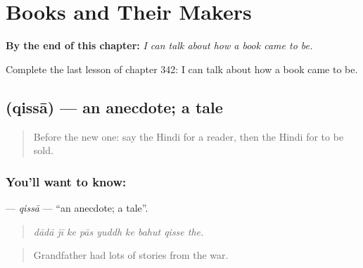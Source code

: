 
\chapter{Books and Their Makers}
\label{ch:hi-books-and-their-makers}

\begin{chapteropening}
\textbf{By the end of this chapter:} \emph{I can talk about how a book came to be.}

Complete the last lesson of chapter 342: I can talk about how a book came to be.
\end{chapteropening}

\section[\texorpdfstring{\hi{क़िस्सा} (qissā)}{क़िस्सा (qissā)}]{ (qissā) — an anecdote; a tale}

\label{lesson:HI-C342-qissa}



\begin{quote}
Before the new one: say the Hindi for a reader, then the Hindi for to be sold.
\end{quote}

\subsection*{You'll want to know: }
\textbf{} — \emph{qissā} — \textquotedblleft{}an anecdote; a tale\textquotedblright{}.

\begin{quote}
        
\end{quote}

\begin{quote}
\emph{dādā jī ke pās yuddh ke bahut qisse the.}
\end{quote}

\begin{quote}
Grandfather had lots of stories from the war.
\end{quote}

